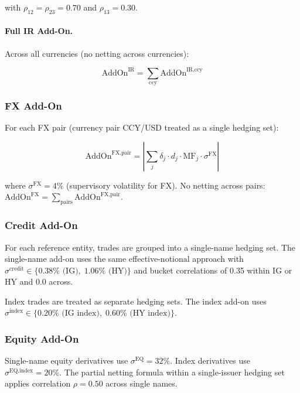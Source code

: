 \documentclass[11pt,a4paper]{article}
\begin{document}
with $\rho_{12} = \rho_{23} = 0.70$ and $\rho_{13} = 0.30$.

\paragraph{Full IR Add-On.}
Across all currencies (no netting across currencies):

\begin{equation}
  \text{AddOn}^{\text{IR}} = \sum_{\text{ccy}} \text{AddOn}^{\text{IR,ccy}}
  \label{eq:ir_total}
\end{equation}

\subsubsection{FX Add-On}

For each FX pair (currency pair CCY/USD treated as a single hedging set):

\begin{equation}
  \text{AddOn}^{\text{FX,pair}} = \left|\sum_j \delta_j \cdot d_j \cdot \text{MF}_j
    \cdot \sigma^{\text{FX}}\right|
  \label{eq:fx_addon}
\end{equation}

where $\sigma^{\text{FX}} = 4\%$ (supervisory volatility for FX).
No netting across pairs:
$\text{AddOn}^{\text{FX}} = \sum_{\text{pairs}} \text{AddOn}^{\text{FX,pair}}$.

\subsubsection{Credit Add-On}

For each reference entity, trades are grouped into a single-name hedging set.
The single-name add-on uses the same effective-notional approach with
$\sigma^{\text{credit}} \in \{0.38\%\text{ (IG)},\; 1.06\%\text{ (HY)}\}$
and bucket correlations of 0.35 within IG or HY and 0.0 across.

Index trades are treated as separate hedging sets. The index add-on uses
$\sigma^{\text{index}} \in \{0.20\%\text{ (IG index)},\; 0.60\%\text{ (HY index)}\}$.

\subsubsection{Equity Add-On}

Single-name equity derivatives use $\sigma^{\text{EQ}} = 32\%$. Index
derivatives use $\sigma^{\text{EQ,index}} = 20\%$. The partial netting
formula within a single-issuer hedging set applies correlation $\rho = 0.50$
across single names.
\end{document}
